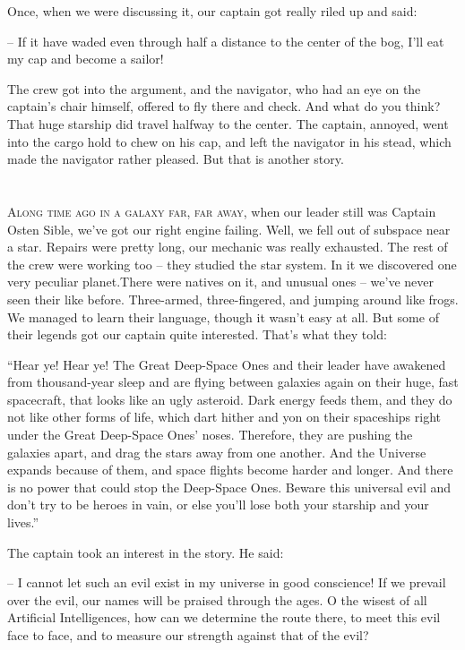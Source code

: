 \documentclass[ebook,twoside,final,openright]{memoir}
\begin{document}
\par
Once, when we were discussing it, our captain got really riled up and said:\par
– If it have waded even through half a distance to the center of the bog, I’ll eat my cap and become a sailor!\par
\par
The crew got into the argument, and the navigator, who had an eye on the captain’s chair himself, offered to fly there and check. And what do you think? That huge starship did travel halfway to the center. The captain, annoyed, went into the cargo hold to chew on his cap, and left the navigator in his stead, which made the navigator rather pleased. But that is another story.
\chapter{}
\par
\lettrine{A}{long time ago in a galaxy far, far away,} when our leader still was Captain Osten Sible, we’ve got our right engine failing. Well, we fell out of subspace near a star. Repairs were pretty long, our mechanic was really exhausted. The rest of the crew were working too – they studied the star system. In it we discovered one very peculiar planet.There were natives on it, and unusual ones – we’ve never seen their like before. Three-armed, three-fingered, and jumping around like frogs. We managed to learn their language, though it wasn’t easy at all. But some of their legends got our captain quite interested. That’s what they told:\par
\par
“Hear ye! Hear ye! The Great Deep-Space Ones and their leader have awakened from thousand-year sleep and are flying between galaxies again on their huge, fast spacecraft, that looks like an ugly asteroid. Dark energy feeds them, and they do not like other forms of life, which dart hither and yon on their spaceships right under the Great Deep-Space Ones’ noses. Therefore, they are pushing the galaxies apart, and drag the stars away from one another. And the Universe expands because of them, and space flights become harder and longer. And there is no power that could stop the Deep-Space Ones. Beware this universal evil and don’t try to be heroes in vain, or else you’ll lose both your starship and your lives.”\par
\par
The captain took an interest in the story. He said:\par
– I cannot let such an evil exist in my universe in good conscience! If we prevail over the evil, our names will be praised through the ages. O the wisest of all Artificial Intelligences, how can we determine the route there, to meet this evil face to face, and to measure our strength against that of the evil?\par
\end{document}

